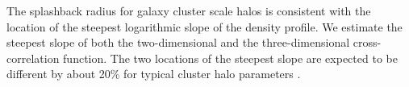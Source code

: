 \documentclass[iop, apjl, twocolappendix, numberedappendix]{emulateapj}
\begin{document}
The splashback radius for galaxy cluster scale halos is consistent
with the location of the steepest logarithmic slope of the density
profile. We estimate the steepest slope of both the two-dimensional
and the three-dimensional cross-correlation function. The two
locations of the steepest slope are expected to be different by
about 20\% for typical cluster halo parameters
\citep{diemer2014dependence, more2016detection}.

%
%
\end{document}
